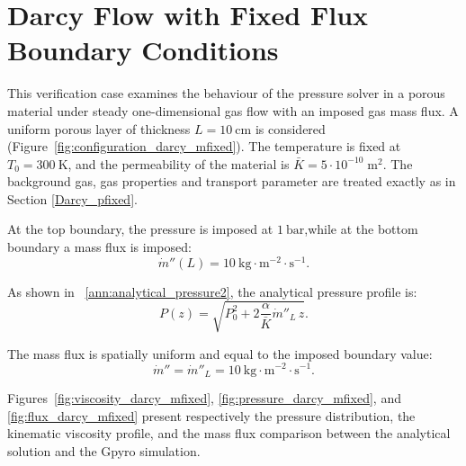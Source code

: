 \documentclass[12pt]{article}
\begin{document}
\fi

\section{Darcy Flow with Fixed Flux Boundary Conditions}

This verification case examines the behaviour of the pressure solver in a porous material under steady one-dimensional gas flow with an imposed gas mass flux.  
A uniform porous layer of thickness $L = 10~\mathrm{cm}$ is considered (Figure~\ref{fig:configuration_darcy_mfixed}).  
The temperature is fixed at $T_0 = 300~\mathrm{K}$, and the permeability of the material is $\bar{K} = 5\cdot 10^{-10} \; \mathrm{m^{2}}$. The background gas, gas properties and transport parameter are treated exactly as in Section \ref{Darcy_pfixed}.

At the top boundary, the pressure is imposed at $1~\mathrm{bar}$,while at the bottom boundary a mass flux is imposed:
\[
\dot{m}''(L) = 10~\mathrm{kg \cdot m^{-2} \cdot s^{-1}}.
\]



As shown in ~\ref{ann:analytical_pressure2}, the analytical pressure profile is:
\begin{equation}
P(z) = \sqrt{
P_0^2 + 2 \frac{\alpha}{\bar{K}} \dot{m}''_{\!L} \, z }.
\end{equation}

The mass flux is spatially uniform and equal to the imposed boundary value:
\begin{equation}
\dot{m}'' = \dot{m}''_{\!L} = 10~\mathrm{kg\cdot m^{-2}\cdot s^{-1}}.
\end{equation}

Figures~\ref{fig:viscosity_darcy_mfixed}, \ref{fig:pressure_darcy_mfixed}, and \ref{fig:flux_darcy_mfixed} present respectively the pressure distribution, the kinematic viscosity profile, and the mass flux comparison between the analytical solution and the Gpyro simulation.
\end{document}
